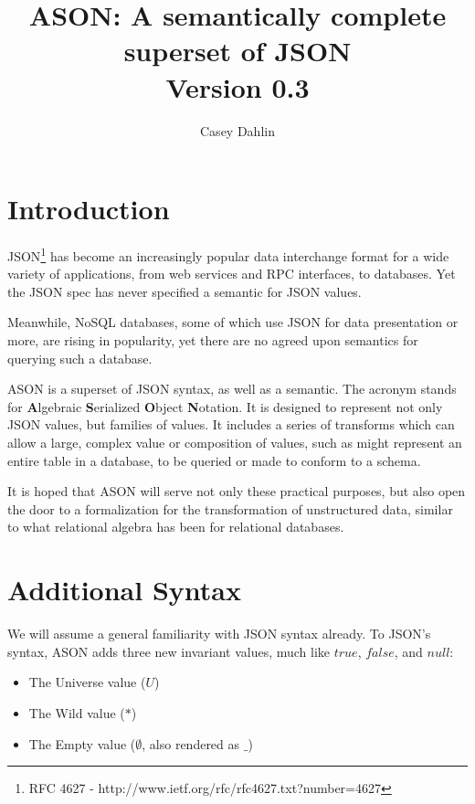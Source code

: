 \documentclass[letterpaper]{article}
\title{ASON: A semantically complete superset of JSON\\\normalsize\vspace{5mm} Version 0.3}
\author{Casey Dahlin}
\begin{document}
\setlength{\parskip}{1em}
\setlength{\parindent}{0em}
\newtheorem{prule}{Rule}
\newcommand{\kvpair}[2]{``#1":\quad#2,\quad}
\newcommand{\kvpaire}[2]{``#1":\quad#2}

\maketitle

\section{Introduction}
JSON\footnote{RFC 4627 - http://www.ietf.org/rfc/rfc4627.txt?number=4627} has
become an increasingly popular data interchange format for a wide variety of
applications, from web services and RPC interfaces, to databases. Yet the JSON
spec has never specified a semantic for JSON values.

Meanwhile, NoSQL databases, some of which use JSON for data presentation or
more, are rising in popularity, yet there are no agreed upon semantics for
querying such a database.

ASON is a superset of JSON syntax, as well as a semantic. The acronym stands
for \textbf{A}lgebraic \textbf{S}erialized \textbf{O}bject \textbf{N}otation.
It is designed to represent not only JSON values, but families of values. It
includes a series of transforms which can allow a large, complex value or
composition of values, such as might represent an entire table in a database,
to be queried or made to conform to a schema.

It is hoped that ASON will serve not only these practical purposes, but also
open the door to a formalization for the transformation of unstructured data,
similar to what relational algebra has been for relational databases.

\section{Additional Syntax}
\begin{samepage}
We will assume a general familiarity with JSON syntax already. To JSON's
syntax, ASON adds three new invariant values, much like \(true\), \(false\),
and \(null\):

\begin{itemize}
	\item The Universe value (\(U\))
	\item The Wild value (\(*\))
	\item The Empty value (\(\emptyset\), also rendered as \(\_\))
\end{itemize}
\end{samepage}
\end{document}
